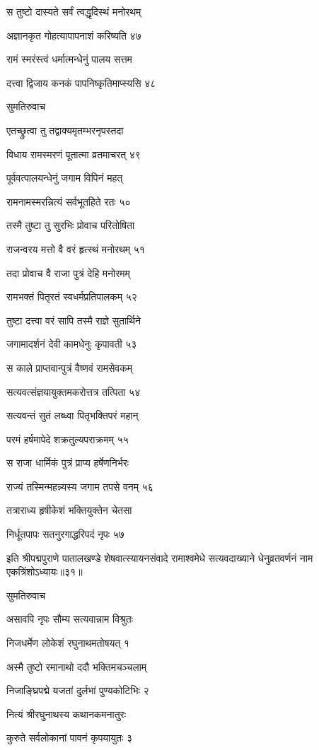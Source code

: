 स तुष्टो दास्यते सर्वं त्वद्धृदिस्थं मनोरथम्

अज्ञानकृत गोहत्यापापनाशं करिष्यति ४७

रामं स्मरंस्त्वं धर्मात्मन्धेनुं पालय सत्तम

दत्त्वा द्विजाय कनकं पापनिष्कृतिमाप्स्यसि ४८

सुमतिरुवाच

एतच्छ्रुत्वा तु तद्वाक्यमृतम्भरनृपस्तदा

विधाय रामस्मरणं पूतात्मा व्रतमाचरत् ४९

पूर्ववत्पालयन्धेनुं जगाम विपिनं महत्

रामनामस्मरन्नित्यं सर्वभूतहिते रतः ५०

तस्मै तुष्टा तु सुरभिः प्रोवाच परितोषिता

राजन्वरय मत्तो वै वरं हृत्स्थं मनोरथम् ५१

तदा प्रोवाच वै राजा पुत्रं देहि मनोरमम्

रामभक्तं पितृरतं स्वधर्मप्रतिपालकम् ५२

तुष्टा दत्त्वा वरं सापि तस्मै राज्ञे सुतार्थिने

जगामादर्शनं देवी कामधेनुः कृपावती ५३

स काले प्राप्तवान्पुत्रं वैष्णवं रामसेवकम्

सत्यवत्संज्ञयायुक्तमकरोत्तत्र तत्पिता ५४

सत्यवन्तं सुतं लब्ध्वा पितृभक्तिपरं महान्

परमं हर्षमापेदे शक्रतुल्यपराक्रमम् ५५

स राजा धार्मिकं पुत्रं प्राप्य हर्षेणनिर्भरः

राज्यं तस्मिन्महन्न्यस्य जगाम तपसे वनम् ५६

तत्राराध्य हृषीकेशं भक्तियुक्तेन चेतसा

निर्धूतपापः सतनुरगाद्धरिपदं नृपः ५७

इति श्रीपद्मपुराणे पातालखण्डे शेषवात्स्यायनसंवादे रामाश्वमेधे सत्यवदाख्याने धेनुव्रतवर्णनं नाम एकत्रिंशोऽध्यायः॥३१॥


सुमतिरुवाच

असावपि नृपः सौम्य सत्यवान्नाम विश्रुतः

निजधर्मेण लोकेशं रघुनाथमतोषयत् १

अस्मै तुष्टो रमानाथो ददौ भक्तिमचञ्चलाम्

निजाङ्घ्रिपद्मे यजतां दुर्लभां पुण्यकोटिभिः २

नित्यं श्रीरघुनाथस्य कथानकमनातुरः

कुरुते सर्वलोकानां पावनं कृपयायुतः ३

